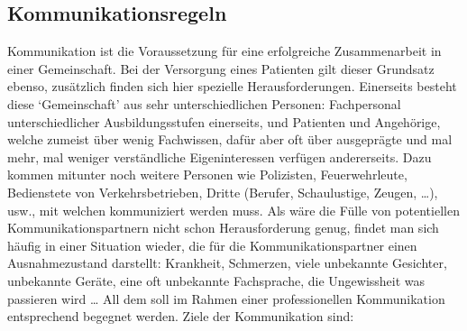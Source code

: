 \documentclass[
ngerman,
paper=a4,
asymmetric,
fontsize=10pt,
draft=false,
numbers=noenddot,
bibtotocnumbered,
footnotes=multiple,
]{scrreprt}
\begin{document}
\subsection{Kommunikationsregeln}
\label{topic:kommunikationsregeln}

\bigskip

Kommunikation ist die Voraussetzung für eine erfolgreiche
Zusammenarbeit in einer Gemeinschaft. Bei der Versorgung
eines Patienten gilt dieser Grundsatz ebenso, zusätzlich
finden sich hier spezielle Herausforderungen. Einerseits
besteht diese \enquote*{Gemeinschaft} aus sehr
unterschiedlichen Personen: Fachpersonal unterschiedlicher
Ausbildungsstufen einerseits, und Patienten und Angehörige,
welche zumeist über wenig Fachwissen, dafür aber oft über
ausgeprägte und mal mehr, mal weniger verständliche
Eigeninteressen verfügen andererseits. Dazu kommen mitunter
noch weitere Personen wie Polizisten, Feuerwehrleute,
Bedienstete von Verkehrsbetrieben, Dritte (Berufer,
Schaulustige, Zeugen, \ldots), usw., mit welchen
kommuniziert werden muss. 
Als wäre die Fülle von potentiellen Kommunikationspartnern
nicht schon Herausforderung genug, findet man sich häufig in einer
Situation wieder, die für die Kommunikationspartner einen
Ausnahmezustand darstellt: Krankheit, Schmerzen,
viele unbekannte Gesichter, unbekannte Geräte, eine oft
unbekannte Fachsprache, die Ungewissheit was passieren wird
{\ldots} All dem soll im Rahmen einer professionellen
Kommunikation entsprechend begegnet werden. 
Ziele der Kommunikation sind:
\end{document}

